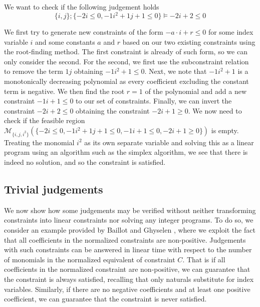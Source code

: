 \begin{examp}
    We want to check if the following judgement holds
    $$\{i, j\}; \{-2i \leq 0, -1i^2 + 1j + 1 \leq 0\} \vDash -2i + 2 \leq 0$$
    
    
    We first try to generate new constraints of the form $-a \cdot i + r \leq 0$ for some index variable $i$ and some constants $a$ and $r$ based on our two existing constraints using the root-finding method. The first constraint is already of such form, so we can only consider the second. For the second, we first use the subconstraint relation to remove the term $1j$ obtaining $-1i^2 + 1 \leq 0$. Next, we note that $-1i^2 + 1$ is a monotonically decreasing polynomial as every coefficient excluding the constant term is negative. We then find the root $r = 1$ of the polynomial and add a new constraint $-1i + 1 \leq 0$ to our set of constraints. Finally, we can invert the constraint $-2i + 2 \leq 0$ obtaining the constraint $-2i + 1 \geq 0$. We now need to check if the feasible region $\mathcal{M}_{\{i, j, i^2\}}(\{-2i \leq 0, -1i^2 + 1j + 1 \leq 0, -1i + 1 \leq 0, -2i + 1 \geq 0\})$ is empty. Treating the monomial $i^2$ as its own separate variable and solving this as a linear program using an algorithm such as the simplex algorithm, we see that there is indeed no solution, and so the constraint is satisfied. 
\end{examp}

\subsection{Trivial judgements}
We now show how some judgements may be verified without neither transforming constraints into linear constraints nor solving any integer programs. To do so, we consider an example provided by Baillot and Ghyselen \cite{BaillotGhyselen2021}, where we exploit the fact that all coefficients in the normalized constraints are non-positive. Judgements with such constraints can be answered in linear time with respect to the number of monomials in the normalized equivalent of constraint $C$. That is if all coefficients in the normalized constraint are non-positive, we can guarantee that the constraint is always satisfied, recalling that only naturals substitute for index variables. Similarly, if there are no negative coefficients and at least one positive coefficient, we can guarantee that the constraint is never satisfied.\\

